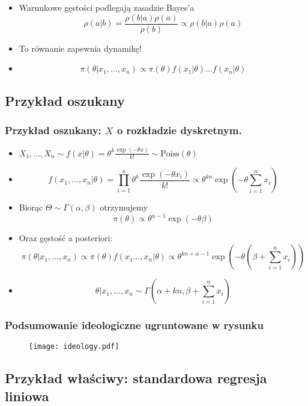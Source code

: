 \documentclass[draft, xetex]{beamer}
\begin{document}
\begin{frame}

	\begin{itemize}
		\item Warunkowe gęstości podlegają zasadzie Bayes'a $$\rho (a | b) = \frac{\rho (b|a) \rho(a)}{\rho(b)} \propto \rho (b|a) \rho(a)$$
		\item To równanie zapewnia dynamikę!
		\item $$ \pi(\theta | x_1, \dots, x_n) \propto \pi(\theta)  f(x_1 | \theta) \dots f(x_n | \theta) $$
	\end{itemize}

\end{frame}

\subsection{Przykład oszukany}

\begin{frame}
	\frametitle{Przykład oszukany: $X$ o rozkładzie dyskretnym.}
	\begin{itemize}
		\item $ X_1 ,\dots, X_n \sim f(x | \theta) = \theta^k \frac{\exp(-\theta x)}{k!} \sim \text{Poiss}(\theta)$
		\item $$ f(x_1, \dots, x_n | \theta) = \prod_{i=1}^n \theta^k \frac{\exp(-\theta x_i)}{k!} \propto \theta^{kn} \exp(-\theta \sum_{i=1}^n x_i)$$
		\item Biorąc $\Theta \sim \Gamma(\alpha,\beta)$ otrzymujemy $$\pi(\theta) \propto \theta^{\alpha-1} \exp (- \theta \beta)$$
		\item Oraz gęstość a posteriori: $$\pi(\theta | x_1, \dots, x_n) \propto \pi(\theta)  f(x_1 \dots, x_n | \theta) \propto \theta^{kn+ \alpha - 1} \exp (- \theta (\beta + \sum_{i=1}^n x_i))$$
		\item $$\theta|x_1, \dots, x_n \sim \Gamma (\alpha + kn, \beta + \sum_{i=1}^n x_i)$$		
		
	\end{itemize}
\end{frame}

\begin{frame}
	\frametitle{Podsumowanie ideologiczne ugruntowane w rysunku}
	\begin{figure}
		\texttt{[image: ideology.pdf]}
	\end{figure}
\end{frame}

\subsection{Przykład właściwy: standardowa regresja liniowa}
\end{document}
